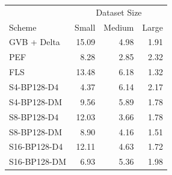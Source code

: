 \begin{tabular}{lrrr}
\toprule
 & \multicolumn{3}{c}{Dataset Size} \\
Scheme & Small & Medium & Large \\
\midrule
GVB + Delta & 15.09 & 4.98 & 1.91 \\
PEF & 8.28 & 2.85 & 2.32 \\
FLS & 13.48 & 6.18 & 1.32 \\
S4-BP128-D4 & 4.37 & 6.14 & 2.17 \\
S4-BP128-DM & 9.56 & 5.89 & 1.78 \\
S8-BP128-D4 & 12.03 & 3.66 & 1.78 \\
S8-BP128-DM & 8.90 & 4.16 & 1.51 \\
S16-BP128-D4 & 12.11 & 4.63 & 1.72 \\
S16-BP128-DM & 6.93 & 5.36 & 1.98 \\
\bottomrule
\end{tabular}
